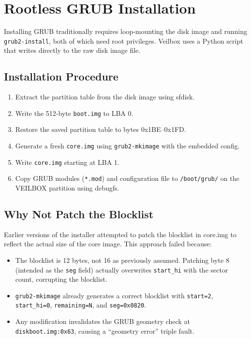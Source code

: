 \section{Rootless GRUB Installation}

Installing GRUB traditionally requires loop-mounting the disk image and
running \texttt{grub2-install}, both of which need root privileges.
Veilbox uses a Python script that writes directly to the raw disk image
file.

\subsection{Installation Procedure}

\begin{enumerate}[nosep]
  \item Extract the partition table from the disk image using sfdisk.
  \item Write the 512-byte \texttt{boot.img} to LBA 0.
  \item Restore the saved partition table to bytes 0x1BE–0x1FD.
  \item Generate a fresh \texttt{core.img} using \texttt{grub2-mkimage}
        with the embedded config.
  \item Write \texttt{core.img} starting at LBA 1.
  \item Copy GRUB modules (\texttt{*.mod}) and configuration file to
        \texttt{/boot/grub/} on the VEILBOX partition using debugfs.
\end{enumerate}

\subsection{Why Not Patch the Blocklist}

Earlier versions of the installer attempted to patch the blocklist in
core.img to reflect the actual size of the core image. This approach
failed because:

\begin{itemize}[nosep]
  \item The blocklist is 12 bytes, not 16 as previously assumed.
        Patching byte 8 (intended as the \texttt{seg} field) actually
        overwrites \texttt{start\_hi} with the sector count, corrupting
        the blocklist.
  \item \texttt{grub2-mkimage} already generates a correct blocklist
        with \texttt{start=2}, \texttt{start\_hi=0},
        \texttt{remaining=N}, and \texttt{seg=0x0820}.
  \item Any modification invalidates the GRUB geometry check at
        \texttt{diskboot.img:0x63}, causing a ``geometry error'' triple
        fault.
\end{itemize}

